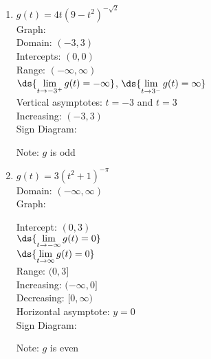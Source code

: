 \documentclass{ximera}
\begin{document}
\newpage

\begin{enumerate}
\setcounter{enumi}{\value{HW}}

\item \begin{multicols}{2} 
$g(t) = 4t (9-t^2)^{-\sqrt{2}}$\\
Graph: \\



\vfill
\columnbreak
 Domain: $(-3, 3)$\\
Intercepts: $(0,0)$\\
Range: $(-\infty, \infty)$\\
$\ds{\lim_{t \rightarrow -3^{+}} g(t) = -\infty}$, $\ds{\lim_{t \rightarrow 3^{-}} g(t) = \infty}$ \\
Vertical asymptotes:  $t = -3$ and $t = 3$\\
Increasing: $(-3,3)$ \\
Sign Diagram:\\

\smallskip




Note:  $g$ is odd

\end{multicols}

\item \begin{multicols}{2} 
$g(t) = 3(t^2+1)^{-\pi}$ \\
Domain: $(-\infty, \infty)$\\
Graph: \\



\vfill
\columnbreak

Intercept: $(0,3)$\\
$\ds{\lim_{t \rightarrow -\infty} g(t) =0}$ \\
$\ds{\lim_{t \rightarrow \infty} g(t) =0}$ \\
Range: $(0, 3]$\\
Increasing: $(-\infty, 0]$ \\
Decreasing: $[0, \infty)$\\
Horizontal asymptote:  $y =0$\\
Sign Diagram:\\

\vspace*{-0.2in}




Note:  $g$ is even

\end{multicols}
\setcounter{HW}{\value{enumi}}
\end{enumerate}
\end{document}
